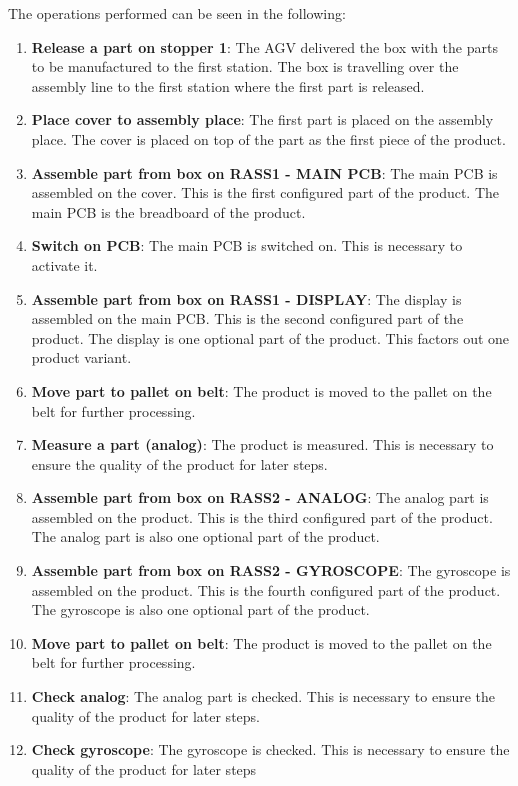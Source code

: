 The operations performed can be seen in the following:

\begin{enumerate}
  \item \textbf{Release a part on stopper 1}: The AGV delivered the box with the parts to be manufactured to the first station. The box is travelling over the assembly line to the first station where the first part is released.
  \item \textbf{Place cover to assembly place}: The first part is placed on the assembly place. The cover is placed on top of the part as the first piece of the product.
  \item \textbf{Assemble part from box on RASS1 - MAIN PCB}: The main PCB is assembled on the cover. This is the first configured part of the product. The main PCB is the breadboard of the product.
  \item \textbf{Switch on PCB}: The main PCB is switched on. This is necessary to activate it.
  \item \textbf{Assemble part from box on RASS1 - DISPLAY}: The display is assembled on the main PCB. This is the second configured part of the product. The display is one optional part of the product. This factors out one product variant.
  \item \textbf{Move part to pallet on belt}: The product is moved to the pallet on the belt for further processing.
  \item \textbf{Measure a part (analog)}: The product is measured. This is necessary to ensure the quality of the product for later steps.
  \item \textbf{Assemble part from box on RASS2 - ANALOG}: The analog part is assembled on the product. This is the third configured part of the product. The analog part is also one optional part of the product.
  \item \textbf{Assemble part from box on RASS2 - GYROSCOPE}: The gyroscope is assembled on the product. This is the fourth configured part of the product. The gyroscope is also one optional part of the product.
  \item \textbf{Move part to pallet on belt}: The product is moved to the pallet on the belt for further processing.
  \item \textbf{Check analog}: The analog part is checked. This is necessary to ensure the quality of the product for later steps.
  \item \textbf{Check gyroscope}: The gyroscope is checked. This is necessary to ensure the quality of the product for later steps

\end{enumerate}
